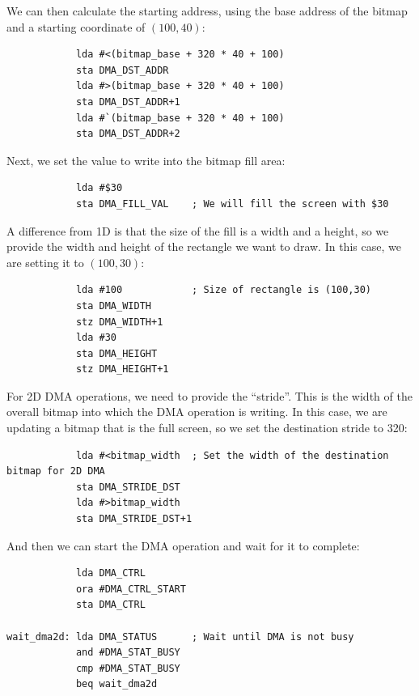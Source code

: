 We can then calculate the starting address, using the base address of the bitmap and a starting coordinate of $(100, 40)$:

\begin{verbatim}
            lda #<(bitmap_base + 320 * 40 + 100)
            sta DMA_DST_ADDR
            lda #>(bitmap_base + 320 * 40 + 100)
            sta DMA_DST_ADDR+1
            lda #`(bitmap_base + 320 * 40 + 100)
            sta DMA_DST_ADDR+2
\end{verbatim}

Next, we set the value to write into the bitmap fill area:

\begin{verbatim}
            lda #$30
            sta DMA_FILL_VAL    ; We will fill the screen with $30     
\end{verbatim}

A difference from 1D is that the size of the fill is a width and a height, so we provide the width and height of the rectangle we want to draw. In this case, we are setting it to $(100, 30)$:

\begin{verbatim}
            lda #100            ; Size of rectangle is (100,30)
            sta DMA_WIDTH
            stz DMA_WIDTH+1
            lda #30
            sta DMA_HEIGHT
            stz DMA_HEIGHT+1
\end{verbatim}

For 2D DMA operations, we need to provide the ``stride''. This is the width of the overall bitmap into which the DMA operation is writing. In this case, we are updating a bitmap that is the full screen, so we set the destination stride to 320:

\begin{verbatim}
            lda #<bitmap_width  ; Set the width of the destination bitmap for 2D DMA
            sta DMA_STRIDE_DST
            lda #>bitmap_width
            sta DMA_STRIDE_DST+1
\end{verbatim}

And then we can start the DMA operation and wait for it to complete:

\begin{verbatim}
            lda DMA_CTRL
            ora #DMA_CTRL_START
            sta DMA_CTRL

wait_dma2d: lda DMA_STATUS      ; Wait until DMA is not busy
            and #DMA_STAT_BUSY
            cmp #DMA_STAT_BUSY
            beq wait_dma2d
\end{verbatim}
